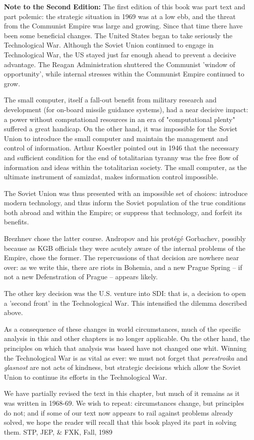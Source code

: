 \begin{mdframed}[backgroundcolor=black!10]
\textbf{Note to the Second Edition:}
The first edition of this book was part text and part polemic: the strategic situation in 1969 was at a low ebb, and the threat from the Communist Empire was large and growing. Since that time there have been some beneficial changes. The United States began to take seriously the Technological War. Although the Soviet Union continued to engage in Technological War, the US stayed just far enough ahead to prevent a decisive advantage. The Reagan Administration shuttered the Communist 'window of opportunity', while internal stresses within the Communist Empire continued to grow.

The small computer, itself a fall-out benefit from military research and development (for on-board missile guidance systems), had a near decisive impact: a power without computational resources in an era of "computational plenty" suffered a great handicap. On the other hand, it was impossible for the Soviet Union to introduce the small computer and maintain the management and control of information. Arthur Koestler pointed out in 1946 that the necessary and sufficient condition for the end of totalitarian tyranny was the free flow of information and ideas within the totalitarian society. The small computer, as the ultimate instrument of samizdat, makes information control impossible.

The Soviet Union was thus presented with an impossible set of choices: introduce modern technology, and thus inform the Soviet population of the true conditions both abroad and within the Empire; or suppress that technology, and forfeit its benefits.

Brezhnev chose the latter course. Andropov and his protégé Gorbachev, possibly because as KGB officials they were acutely aware of the internal problems of the Empire, chose the former. The repercussions of that decision are nowhere near over: as we write this, there are riots in Bohemia, and a new Prague Spring -- if not a new Defenstration of Prague -- appears likely.

The other key decision was the U.S. venture into SDI: that is, a decision to open a 'second front' in the Technological War. This intensified the dilemma described above.

As a consequence of these changes in world circumstances, much of the specific analysis in this and other chapters is no longer applicable. On the other hand, the principles on which that analysis was based have not changed one whit. Winning the Technological War is as vital as ever: we must not forget that \textit{perestroika} and \textit{glasnost} are not acts of kindness, but strategic decisions which allow the Soviet Union to continue its efforts in the Technological War.

We have partially revised the text in this chapter, but much of it remains as it was written in 1968-69. We wish to repeat: circumstances change, but principles do not; and if some of our text now appears to rail against problems already solved, we hope the reader will recall that this book played its part in solving them. STP, JEP, \& FXK, Fall, 1989
\end{mdframed}


